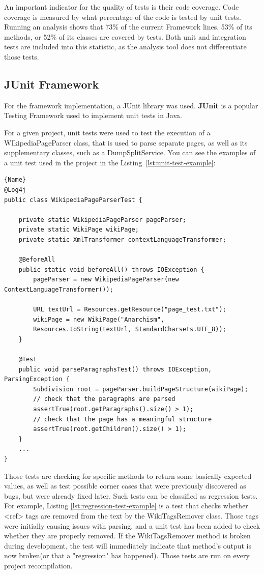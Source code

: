 \documentclass[thesis=M,english,hidelinks]{FITthesis}[2019/12/23]
\begin{document}
An important indicator for the quality of tests is their code coverage. Code coverage is measured by what percentage of the code is tested by unit tests. Running an analysis shows that  73\% of the current Framework lines, 53\% of its methods, or 52\% of its classes are covered by tests. Both unit and integration tests are included into this statistic, as the analysis tool does not differentiate those tests.


\subsection{JUnit Framework}

For the framework implementation, a JUnit library was used. \textbf{JUnit} is a  popular Testing Framework used to implement unit tests in Java\cite{junit_framework}.

For a given project, unit tests were used to test the execution of a WIkipediaPageParser class, that is used to parse separate pages, as well as its supplementary classes, such as a DumpSplitService. You can see the examples of a unit test used in the project in the Listing\ \ref{lst:unit-test-example}:


\begin{lstlisting}[caption=JUnit Paragraph Parsing Unit Test Class,frame=tlrb,  label = {lst:unit-test-example}]{Name}
@Log4j
public class WikipediaPageParserTest {

	private static WikipediaPageParser pageParser;
	private static WikiPage wikiPage;
	private static XmlTransformer contextLanguageTransformer;
	
	@BeforeAll
	public static void beforeAll() throws IOException {
		pageParser = new WikipediaPageParser(new ContextLanguageTransformer());
		
		URL textUrl = Resources.getResource("page_test.txt");
		wikiPage = new WikiPage("Anarchism",
		Resources.toString(textUrl, StandardCharsets.UTF_8));
	}
	
	@Test
	public void parseParagraphsTest() throws IOException, ParsingException {
		Subdivision root = pageParser.buildPageStructure(wikiPage);
		// check that the paragraphs are parsed
		assertTrue(root.getParagraphs().size() > 1);
		// check that the page has a meaningful structure
		assertTrue(root.getChildren().size() > 1);
	}
	...
}
\end{lstlisting}

Those tests are checking for specific methods to return some basically expected values, as well as test possible corner cases that were previously discovered as bugs, but were already fixed later. Such tests can be classified as regression tests.  For example, Listing \ref{lst:regression-test-example} is a test that checks whether <ref> tags are removed from the text by the WikiTagsRemover class. Those tags were initially causing issues with parsing, and a unit test has been added to check whether they are properly removed. If the WikiTagsRemover method is broken during development, the test will immediately indicate that method's output is now broken(or that a "regression" has happened). Those tests are run on every project recompilation.
\end{document}

